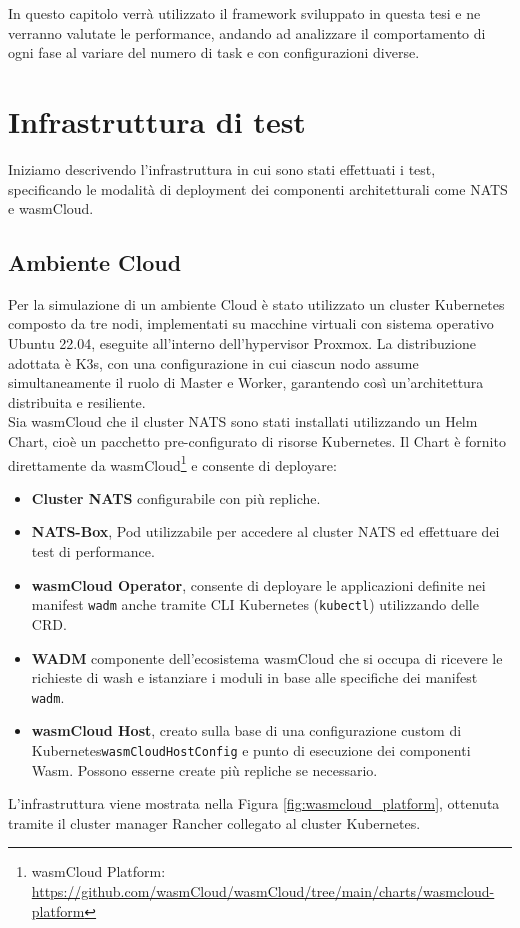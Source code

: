 In questo capitolo verrà utilizzato il framework sviluppato in questa tesi e ne verranno valutate le performance, andando ad analizzare il comportamento di ogni fase al variare del numero di task e con configurazioni diverse.

\section{Infrastruttura di test}

Iniziamo descrivendo l'infrastruttura in cui sono stati effettuati i test, specificando le modalità di deployment dei componenti architetturali come NATS e wasmCloud.

\subsection{Ambiente Cloud}

Per la simulazione di un ambiente Cloud è stato utilizzato un cluster Kubernetes composto da tre nodi, implementati su macchine virtuali con sistema operativo Ubuntu 22.04, eseguite all'interno dell'hypervisor Proxmox. La distribuzione adottata è K3s, con una configurazione in cui ciascun nodo assume simultaneamente il ruolo di Master e Worker, garantendo così un'architettura distribuita e resiliente.\\
Sia wasmCloud che il cluster NATS sono stati installati utilizzando un Helm Chart, cioè un pacchetto pre-configurato di risorse Kubernetes. Il Chart è fornito direttamente da wasmCloud\footnote{wasmCloud Platform: \url{https://github.com/wasmCloud/wasmCloud/tree/main/charts/wasmcloud-platform}} e consente di deployare:
\begin{itemize}
    \item \textbf{Cluster NATS} configurabile con più repliche.
    \item \textbf{NATS-Box}, Pod utilizzabile per accedere al cluster NATS ed effettuare dei test di performance.
    \item \textbf{wasmCloud Operator}, consente di deployare le applicazioni definite nei manifest \texttt{wadm} anche tramite CLI Kubernetes (\texttt{kubectl}) utilizzando delle CRD.
    \item \textbf{WADM} componente dell'ecosistema wasmCloud che si occupa di ricevere le richieste di wash e istanziare i moduli in base alle specifiche dei manifest \texttt{wadm}.
    \item \textbf{wasmCloud Host}, creato sulla base di una configurazione custom di Kubernetes\texttt{wasmCloudHostConfig} e punto di esecuzione dei componenti Wasm. Possono esserne create più repliche se necessario.
\end{itemize}
L'infrastruttura viene mostrata nella Figura \ref{fig:wasmcloud_platform}, ottenuta tramite il cluster manager Rancher collegato al cluster Kubernetes.

